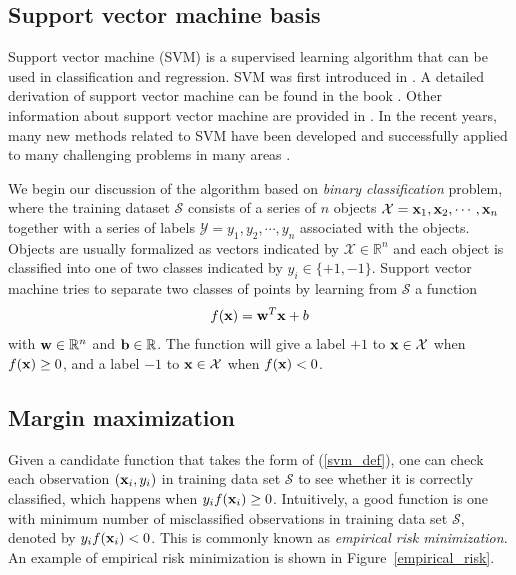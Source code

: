 \documentclass[english]{tktltiki}
\newcommand{\Xcal}{\mathcal{X}} %
\newcommand{\Ycal}{\mathcal{Y}} %
\newcommand{\Scal}{\mathcal{S}}
\newcommand{\xb}{{\bf x}}
\newcommand{\wb}{{\bf w}}
\newcommand{\bb}{{\bf b}}
\begin{document}
\subsection{Support vector machine basis}


Support vector machine (SVM) is a supervised learning algorithm that can be used in classification and regression. SVM was first introduced in \cite{boser92}. A detailed derivation of support vector machine can be found in the book \cite{cristianini00}. Other information about support vector machine are provided in \cite{vapnik99, burges98, muller01, herbrich02}. In the recent years, many new methods related to SVM have been developed and successfully applied to many challenging problems in many areas \cite{scholkopf02, scholkopf04}. 

We begin our discussion of the algorithm based on {\em binary classification} problem, where the training dataset \(\Scal\) consists of a series of $n$ objects \(\Xcal = \xb_1,\xb_2,\cdots,\xb_n\) together with a series of labels \(\Ycal = y_1, y_2, \cdots, y_n\) associated with the objects. Objects are usually formalized as vectors indicated by \(\Xcal \in \mathbb{R}^n\) and each object is classified into one of two classes indicated by \(y_i \in \{+1,-1\}\). Support vector machine tries to separate two classes of points by learning from \(\Scal\) a function
\begin{align}
f(\xb) = \wb^T \xb + b
\label{svm_def}
\end{align}
with \(\wb \in \mathbb{R}^n\) and \(\bb \in \mathbb{R}\). The function will give a label $+1$ to \(\xb \in \Xcal\) when \(f(\xb) \ge 0\), and a label $-1$ to \(\xb \in \Xcal\) when \(f(\xb) < 0\).

\subsection{Margin maximization}


Given a candidate function that takes the form of (\ref{svm_def}), one can check each observation \((\xb_i, y_i)\) in training data set \(\Scal\) to see whether it is correctly classified, which happens when \(y_if(\xb_i) \ge 0\). Intuitively,  a good function is one with minimum number of misclassified observations in training data set \(\Scal\), denoted by $y_if(\xb_i)<0$. This is commonly known as {\em empirical risk minimization}. An example of {empirical risk minimization} is shown in Figure~\ref{empirical_risk}.
\end{document}
